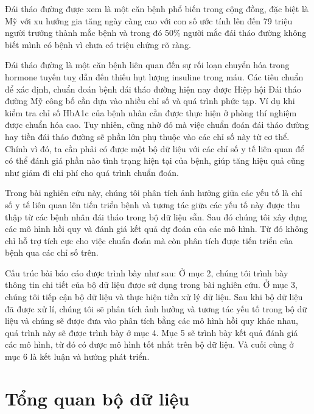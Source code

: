 \documentclass[runningheads]{llncs}
\begin{document}
Đái tháo đường được xem là một căn bệnh phổ biến trong cộng đồng, đặc biệt là Mỹ với xu hướng gia tăng ngày càng cao với con số ước tính lên đến 79 triệu người trưởng thành mắc bệnh và trong đó 50\% người mắc đái tháo đường không biết mình có bệnh vì chưa có triệu chứng rõ ràng. 

Đái tháo đường là một căn bệnh liên quan đến sự rối loạn chuyển hóa trong hormone tuyến tuỵ dẫn đến thiếu hụt lượng insuline trong máu. Các tiêu chuẩn để xác định, chuẩn đoán bệnh đái tháo đường hiện nay được Hiệp hội Đái tháo đường Mỹ công bố cần dựa vào nhiều chỉ số và quá trình phức tạp. Ví dụ khi kiểm tra chỉ số HbA1c của bệnh nhân cần được thực hiện ở phòng thí nghiệm được chuẩn hóa cao. Tuy nhiên, cũng nhờ đó mà việc chuẩn đoán đái tháo đường hay tiền đái tháo đường sẽ phần lớn phụ thuộc vào các chỉ số này từ cơ thể. 
Chính vì đó, ta cần phải có được một bộ dữ liệu với các chỉ số y tế liên quan để có thể đánh giá phần nào tình trạng hiện tại của bệnh, giúp tăng hiệu quả cũng như giảm đi chi phí cho quá trình chuẩn đoán. 

Trong bài nghiên cứu này, chúng tôi phân tích ảnh hưởng giữa các yếu tố là chỉ số y tế liên quan lên tiến triển bệnh và tương tác giữa các yếu tố này được thu thập từ các bệnh nhân đái tháo trong bộ dữ liệu sẵn. Sau đó chúng tôi xây dựng các mô hình hồi quy và đánh giá kết quả dự đoán của các mô hình. Từ đó không chỉ hỗ trợ tích cực cho việc chuẩn đoán mà còn phân tích được tiến triển của bệnh qua các chỉ số trên.

Cấu trúc bài báo cáo được trình bày như sau: Ở mục 2, chúng tôi trình bày thông tin chi tiết của bộ dữ liệu được sử dụng trong bài nghiên cứu. Ở mục 3, chúng tôi tiếp cận bộ dữ liệu và thực hiện tiền xử lý dữ liệu. Sau khi bộ dữ liệu đã được xử lí, chúng tôi sẽ phân tích ảnh hưởng và tương tác yếu tố trong bộ dữ liệu và chúng sẽ được đưa vào phân tích bằng các mô hình hồi quy khác nhau, quá trình này sẽ được trình bày ở mục 4. Mục 5 sẽ trình bày kết quả đánh giá các mô hình, từ đó có được mô hình tốt nhất trên bộ dữ liệu. Và cuối cùng ở mục 6 là kết luận và hướng phát triển.

\section{Tổng quan bộ dữ liệu}
\end{document}
